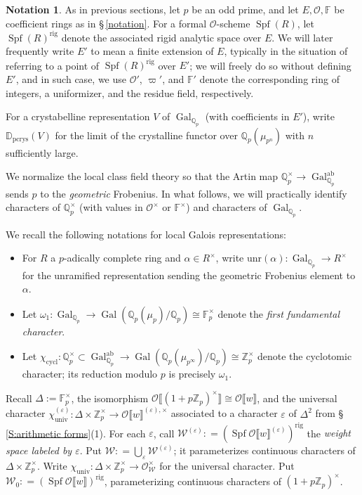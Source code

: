 \documentclass[12pt]{amsart}
\theoremstyle{definition}
\newtheorem{notation}[subsection]{Notation}
\numberwithin{equation}{subsection}
\def\calO{\mathcal{O}}
\def\calW{\mathcal{W}}
\def\DD{\mathbb{D}}
\def\FF{\mathbb{F}}
\def\QQ{\mathbb{Q}}
\def\ZZ{\mathbb{Z}}
\DeclareMathOperator{\Gal}{Gal}
\DeclareMathOperator{\Spf}{Spf}
\newcommand{\cycl}{\mathrm{cycl}}
\newcommand{\pcrys}{\mathrm{pcrys}}
\newcommand{\unr}{\mathrm{unr}}
\newcommand{\rig}{\mathrm{rig}}
\newcommand{\univ}{\mathrm{univ}}
\begin{document}
\begin{notation}
\label{N:weight space}
As in previous sections, let $p$ be an odd prime, and let $E, \calO, \FF$ be coefficient rings as in \S\,\ref{notation}.
For a formal $\calO$-scheme $\Spf(R)$, let $\Spf(R)^\rig$ denote the associated rigid analytic space over $E$.
We will later frequently write $E'$ to mean a finite extension of $E$, typically in the situation of referring to a point of $\Spf(R)^\rig$ over $E'$; we will freely do so without defining $E'$, and in such case, we use $\calO'$, $\varpi'$, and $\FF'$ denote the corresponding ring of integers, a uniformizer, and the residue field, respectively.

For a crystabelline representation $V$ of $\Gal_{\QQ_p}$ (with coefficients in $E'$), write $\DD_\pcrys(V)$ for the limit of the crystalline functor over $\QQ_p(\mu_{p^n})$ with $n$ sufficiently large.

We normalize the local class field theory so that the Artin map $\QQ_p^\times \to \Gal_{\QQ_p}^\mathrm{ab}$ sends $p$ to the \emph{geometric} Frobenius. In what follows, we will practically identify characters of $\QQ_p^\times$ (with values in $\calO^\times$ or $\FF^\times$) and characters of $\Gal_{\QQ_p}$.

We recall the following notations for local Galois representations: 
\begin{itemize}
\item For $R$ a $p$-adically complete ring and $\alpha \in R^\times$, write $\unr(\alpha): \Gal_{\QQ_p} \to R^\times$ for the unramified representation sending the geometric Frobenius element to $\alpha$.
\item Let $\omega_1: \Gal_{\QQ_p}\to \Gal(\QQ_p(\mu_p)/\QQ_p) \cong \FF_p^\times$ denote the \emph{first fundamental character}.
\item 
Let $\chi_\cycl: \QQ_p^\times \subset \Gal_{\QQ_p}^\mathrm{ab} \to \Gal(\QQ_p(\mu_{p^\infty})/\QQ_p) \cong \ZZ_p^\times$ denote the cyclotomic character; its reduction modulo $p$ is precisely $\omega_1$.
\end{itemize} 



Recall $\Delta:= \FF_p^\times$,  the isomorphism $
\calO\llbracket (1+p\ZZ_p)^\times\rrbracket \cong  \calO\llbracket w \rrbracket$, and the universal character $\chi_\univ^{(\varepsilon)}: \Delta \times \ZZ_p^\times \to \calO\llbracket w \rrbracket^{(\varepsilon),\times}$ associated to a character $\varepsilon$ of $\Delta^2$ from \S\,\ref{S:arithmetic forms}(1).
For each $\varepsilon$, call $\calW^{(\varepsilon)}: = (\Spf \calO\llbracket w \rrbracket^{(\varepsilon)})^\rig$ the \emph{weight space labeled by $\varepsilon$}. 
Put $\calW: = \bigcup_{\varepsilon} \calW^{(\varepsilon)}$; it parameterizes continuous characters of $\Delta \times \ZZ_p^\times$. Write $\chi_\univ: \Delta \times \ZZ_p^\times \to \calO_\calW^\times$ for the universal character. 
Put $\calW_0: = (\Spf \calO\llbracket w \rrbracket)^\rig$, parameterizing continuous characters of $(1+p\ZZ_p)^\times$.


\end{notation}
\end{document}
